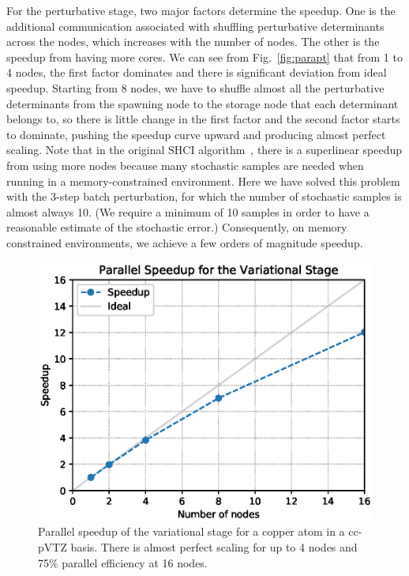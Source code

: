 \documentclass[%
reprint,
 superscriptaddress,
 amsmath,amssymb,
 aps,
]{revtex4-1}
\begin{document}
For the perturbative stage, two major factors determine the speedup.
One is the additional communication associated with
shuffling perturbative determinants across the nodes, which increases with the number of nodes.
The other is the speedup from having more cores.
We can see from Fig.~\ref{fig:parapt} that from 1 to 4 nodes, the first factor dominates and there is significant deviation from ideal speedup.
Starting from 8 nodes, we have to shuffle almost all the perturbative determinants from the spawning node to the storage node that each determinant belongs to,
so there is little change in the first factor and the second factor starts to dominate, pushing the speedup curve upward and producing almost perfect scaling.
Note that in the original SHCI algorithm~\cite{ShaHolJeaAlaUmr-JCTC-17}, there is a superlinear speedup from using more nodes
because many stochastic samples are needed when running in a memory-constrained environment.
Here we have solved this problem with the 3-step batch perturbation, for which the number of stochastic samples
is almost always 10.  (We require a minimum of 10 samples in order to have a reasonable estimate of the stochastic error.)
Consequently, 
on memory constrained environments,
we achieve a few orders of magnitude speedup.

\begin{figure}[h]
  \includegraphics[width=\linewidth]{scalability/var}
  \caption{Parallel speedup of the variational stage for a copper atom in a cc-pVTZ basis.
There is almost perfect scaling for up to 4 nodes and 75\% parallel efficiency at 16 nodes.
}
  \label{fig:paravar}
\end{figure}
 
\end{document}
